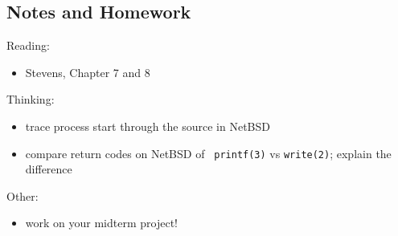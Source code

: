 \documentclass[xga]{xdvislides}
\begin{document}
\subsection{Notes and Homework}

Reading:
\begin{itemize}
	\item Stevens, Chapter 7 and 8
\end{itemize}
\vspace{.5in}
Thinking:
\begin{itemize}
	\item trace process start through the source in NetBSD
	\item compare return codes on NetBSD of {\tt
		printf(3)} vs {\tt write(2)}; explain
		the difference
\end{itemize}
\vspace{.5in}
Other:
\begin{itemize}
	\item work on your midterm project!
\end{itemize}
\end{document}
